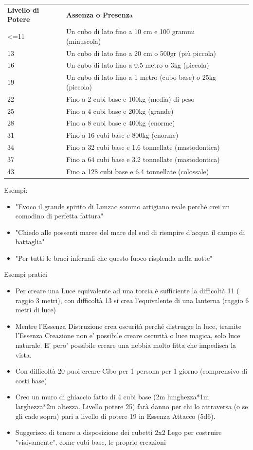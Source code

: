 \documentclass[a4paper,11pt,twoside,openany]{book}
\begin{document}
\begin{tabularx}{0.95\textwidth}{lXlXX}
	\toprule
	\textbf{Livello di Potere} & \textbf{Assenza o Presenz}a\\
	\textless=11     & Un cubo di lato fino a 10 cm e 100 grammi (minuscola)\\
	13               & Un cubo di lato fino a 20 cm o 500gr (più piccola)\\
	16               & Un cubo di lato fino a 0.5 metro o 3kg (piccola)\\
	19               & Un cubo di lato fino a 1 metro (cubo base) o 25kg (piccola)\\
	22               & Fino a 2 cubi base e 100kg (media) di peso\\
	25               & Fino a 4 cubi base e 200kg (grande)\\
	28               & Fino a 8 cubi base e 400kg (enorme)\\
	31               & Fino a 16 cubi base e 800kg (enorme)\\
	34               & Fino a 32 cubi base e 1.6 tonnellate (mastodontica)\\
	37               & Fino a 64 cubi base e 3.2 tonnellate (mastodontica)\\
	43               & Fino a 128 cubi base e 6.4 tonnellate (colossale)\\
\end{tabularx}

\bigskip

Esempi:
\begin{itemize}
	\item "Evoco il grande spirito di Lunzac sommo artigiano reale perché crei un comodino di perfetta fattura"
	\item "Chiedo alle possenti maree del mare del sud di riempire d'acqua il campo di battaglia"
	\item "Per tutti le braci infernali che questo fuoco risplenda nella notte"
\end{itemize}

\bigskip

Esempi pratici
\begin{itemize}
	\item Per creare una Luce equivalente ad una torcia è sufficiente la difficoltà 11 ( raggio 3 metri), con difficoltà 13 si crea l'equivalente di una lanterna (raggio 6 metri di luce)
	\item Mentre l'Essenza Distruzione crea oscurità perché distrugge la luce, tramite l'Essenza Creazione non e' possibile creare oscurità o luce magica, solo luce naturale. E' pero' possibile creare una nebbia molto fitta che impedisca la vista.
	\item Con difficoltà 20 puoi creare Cibo per 1 persona per 1 giorno (comprensivo di costi base)
	\item Creo un muro di ghiaccio fatto di 4 cubi base (2m lunghezza{*}1m larghezza{*}2m altezza. Livello potere 25) farà danno per chi lo attraversa (o se gli cade sopra) pari a livello di potere 19 in Essenza Attacco (5d6).
	\item Suggerisco di tenere a disposizione dei cubetti 2x2 Lego per costruire "visivamente", come cubi base, le proprio creazioni
\end{itemize}
\end{document}
